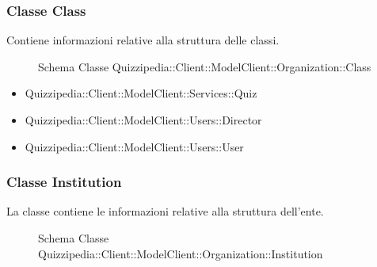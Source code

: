\subsubsection{Classe Class}
Contiene informazioni relative alla struttura delle classi.
\begin{figure}[H]
\centering
\noindent{}
\caption[Schema Classe Class]{Schema Classe Quizzipedia::Client::ModelClient::Organization::Class}
\end{figure}
\begin{itemize}
\item Quizzipedia::Client::ModelClient::Services::Quiz
\item Quizzipedia::Client::ModelClient::Users::Director
\item Quizzipedia::Client::ModelClient::Users::User
\end{itemize}
\subsubsection{Classe Institution}
La classe contiene le informazioni relative alla struttura dell'ente.
\begin{figure}[H]
\centering
\noindent{}
\caption[Schema Classe Institution]{Schema Classe Quizzipedia::Client::ModelClient::Organization::Institution}
\end{figure}
